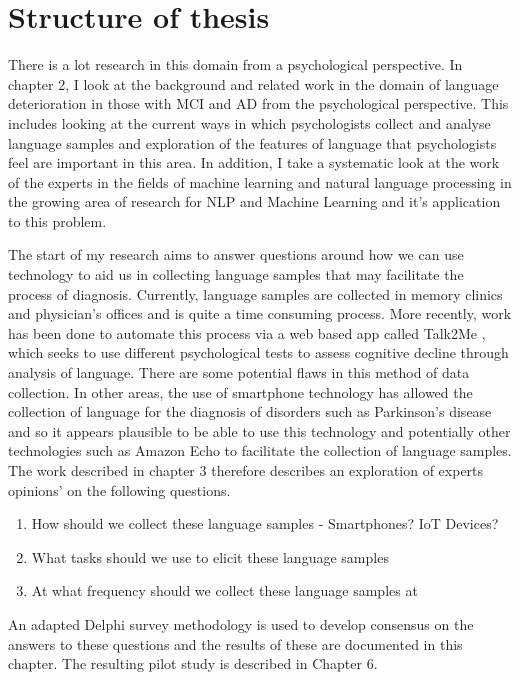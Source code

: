 \section{Structure of thesis}
There is a lot research in this domain from a psychological perspective. In chapter 2, I look at the background and related work in the domain of language deterioration in those with MCI and AD from the psychological perspective. This includes looking at the current ways in which psychologists collect and analyse language samples and exploration of the features of language that psychologists feel are important in this area. In addition, I take a systematic look at the work of the experts in the fields of machine learning and natural language processing in the growing area of research for NLP and Machine Learning and it's application to this problem. 
\par 
The start of my research aims to answer questions around how we can use technology to aid us in collecting language samples that may facilitate the process of diagnosis. Currently, language samples are collected in memory clinics and physician's offices and is quite a time consuming process. More recently, work has been done to automate this process via a web based app called Talk2Me \cite{Komeili2019}, which seeks to use different psychological tests to assess cognitive decline through analysis of language. There are some potential flaws in this method of data collection.  In other areas, the use of smartphone technology has allowed the collection of language for the diagnosis of disorders such as Parkinson's disease and so it appears plausible to be able to use this technology and potentially other technologies such as Amazon Echo to facilitate the collection of language samples. The work described in chapter 3 therefore describes an exploration of experts opinions' on the following questions.
\begin{enumerate}
	\item How should we collect these language samples - Smartphones? IoT Devices?
	\item What tasks should we use to elicit these language samples
	\item At what frequency should we collect these language samples at
\end{enumerate}
\par 
An adapted Delphi survey methodology is used to develop consensus on the answers to these questions and the results of these are documented in this chapter. The resulting pilot study is described in Chapter 6.
